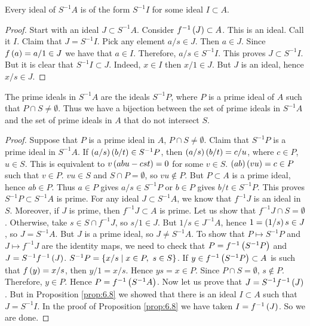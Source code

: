 \begin{proposition}
\label{prop:6.8}
Every ideal of $ S^{-1}A $ is of the form $ S^{-1}I $ for some ideal $ I \subset A $.
\end{proposition}

\begin{proof}
Start with an ideal $ J \subset S^{-1}A $. Consider $ f^{-1}\left( J \right) \subset A $. This is an ideal. Call it $ I $. Claim that $ J = S^{-1}I $. Pick any element $ a / s \in J $. Then $ a \in J $. Since $ f\left( a \right) = a / 1 \in J $ we have that $ a \in I $. Therefore, $ a / s \in S^{-1}I $. This proves $ J \subset S^{-1}I $. But it is clear that $ S^{-1}I \subset J $. Indeed, $ x \in I $ then $ x / 1 \in J $. But $ J $ is an ideal, hence $ x / s \in J $.
\end{proof}

\begin{theorem}
\label{thm:6.9}
The prime ideals in $ S^{-1}A $ are the ideals $ S^{-1}P $, where $ P $ is a prime ideal of $ A $ such that $ P \cap S \ne \emptyset $. Thus we have a bijection between the set of prime ideals in $ S^{-1}A $ and the set of prime ideals in $ A $ that do not intersect $ S $.
\end{theorem}

\begin{proof}
Suppose that $ P $ is a prime ideal in $ A $, $ P \cap S \ne \emptyset $. Claim that $ S^{-1}P $ is a prime ideal in $ S^{-1}A $. If $ \left( a / s \right)\left( b / t \right) \in S^{-1}P $, then $ \left( a / s \right)\left( b / t \right) = c / u $, where $ c \in P $, $ u \in S $. This is equivalent to $ v\left( abu - cst \right) = 0 $ for some $ v \in S $. $ \left( ab \right)\left( vu \right) = c \in P $ such that $ v \in P $. $ vu \in S $ and $ S \cap P = \emptyset $, so $ vu \notin P $. But $ P \subset A $ is a prime ideal, hence $ ab \in P $. Thus $ a \in P $ gives $ a / s \in S^{-1}P $ or $ b \in P $ gives $ b / t \in S^{-1}P $. This proves $ S^{-1}P \subset S^{-1}A $ is prime. For any ideal $ J \subset S^{-1}A $, we know that $ f^{-1}J $ is an ideal in $ S $. Moreover, if $ J $ is prime, then $ f^{-1}J \subset A $ is prime. Let us show that $ f^{-1}J \cap S = \emptyset $. Otherwise, take $ s \in S \cap f^{-1}J $, so $ s / 1 \in J $. But $ 1 / s \in J^{-1}A $, hence $ 1 = \left( 1 / s \right)s \in J $, so $ J = S^{-1}A $. But $ J $ is a prime ideal, so $ J \ne S^{-1}A $. To show that $ P \mapsto S^{-1}P $ and $ J \mapsto f^{-1}J $ are the identity maps, we need to check that $ P = f^{-1}\left( S^{-1}P \right) $ and $ J = S^{-1}f^{-1}\left( J \right) $. $ S^{-1}P = \left\{ x / s \mid x \in P, \ s \in S \right\} $. If $ y \in f^{-1}\left( S^{-1}P \right) \subset A $  is such that $ f\left( y \right) = x / s $, then $ y / 1 = x / s $. Hence $ ys = x \in P $. Since $ P \cap S = \emptyset $, $ s \notin P $. Therefore, $ y \in P $. Hence $ P = f^{-1}\left( S^{-1}A \right) $. Now let us prove that $ J = S^{-1}f^{-1}\left( J \right) $. But in Proposition \ref{prop:6.8} we showed that there is an ideal $ I \subset A $ such that $ J = S^{-1}I $. In the proof of Proposition \ref{prop:6.8} we have taken $ I = f^{-1}\left( J \right) $. So we are done.
\end{proof}

